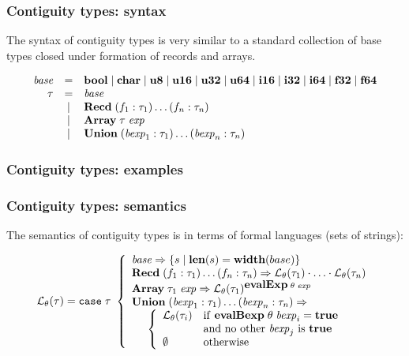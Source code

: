 \documentclass{beamer}
\newcommand{\konst}[1]{\ensuremath{\mbox{\bf{#1}}}}
\newcommand{\set}[1]{\{ {#1} \}}
\newcommand{\LangTheta}[1]{\ensuremath{{\mathcal L}_{\theta}({#1})}}
\begin{document}
\begin{frame}[fragile]\frametitle{Contiguity types: syntax}

The syntax of contiguity types is very similar to a standard
collection of base types closed under formation of records and arrays.

\[
\begin{array}{rcl}
 \mathit{base} & = & \konst{bool} \mid \konst{char} \mid \konst{u8} \mid
 \konst{u16} \mid \konst{u32} \mid \konst{u64}  \mid \konst{i16} \mid
 \konst{i32} \mid \konst{i64} \mid \konst{f32} \mid \konst{f64} \\
 \tau & = & \mathit{base} \\
      & \mid & \konst{Recd}\; (f_1 : \tau_1) \ldots (f_n : \tau_n) \\
      & \mid & \konst{Array}\; \tau \; \mathit{exp} \\
      & \mid & \konst{Union}\; (\mathit{bexp}_1 : \tau_1) \ldots (\mathit{bexp}_n : \tau_n)
\end{array}
\]
\end{frame}

\begin{frame}[fragile]\frametitle{Contiguity types: examples}
\end{frame}

\begin{frame}[fragile]\frametitle{Contiguity types: semantics}

The semantics of contiguity types is in terms of formal languages
(sets of strings):

\[
\LangTheta{\tau} =
\mathtt{case}\; \tau\
 \left\{
 \begin{array}{l}
 \mathit{base} \Rightarrow \set{s \mid \konst{len}(s) = \konst{width}(base)} \\
 \konst{Recd}\; (f_1 : \tau_1) \ldots (f_n : \tau_n)
      \Rightarrow \LangTheta{\tau_1} \cdot \ldots \cdot \LangTheta{\tau_n}
\\
 \konst{Array}\; \tau_1 \; \mathit{exp}
      \Rightarrow  \LangTheta{\tau_1}^{\konst{evalExp}\;\theta\;\mathit{exp}}
\\
 \konst{Union}\; (\mathit{bexp}_1 : \tau_1) \ldots (\mathit{bexp}_n : \tau_n) \Rightarrow \\
  \hspace*{5mm}
 \left\{
 \begin{array}{ll}
    \LangTheta{\tau_i} &  \mathrm{if}\ \konst{evalBexp}\;\theta\;\mathit{bexp}_i = \konst{true} \\
                  & \mathrm{and\ no\ other}\ \mathit{bexp}_j\ \mathrm{is}\ \konst{true}  \\
    \emptyset & \mathrm{otherwise}
 \end{array}
 \right.
 \\
\end{array}
 \right.
\]
\end{frame}
\end{document}
